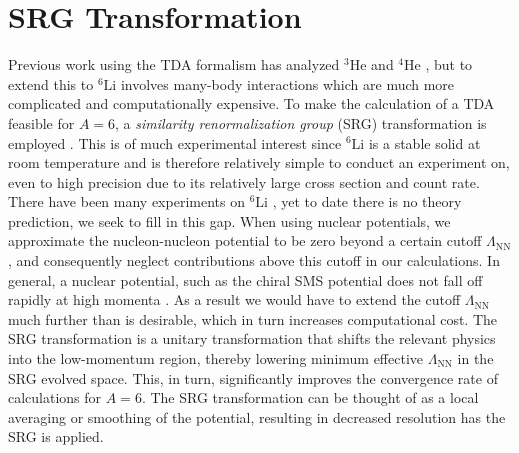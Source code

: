 \documentclass[a4paper,11pt]{article}
\newcommand{\LamNN}{\Lambda_{\mathrm{NN}}}
\newcommand{\LiS}{{}^{6} \mathrm{Li} }
\newcommand{\HeF}{{}^{4} \mathrm{He}}
\newcommand{\HeT}{{}^{3} \mathrm{He}}
\begin{document}
\section{SRG Transformation}
Previous work using the TDA formalism has analyzed
$\HeT$ and $\HeF$
\cite{hammer2020, hammer4He}
, but to extend this to $\LiS$ involves many-body
interactions which are much more complicated and computationally expensive.
To make the calculation of a TDA feasible for $A=6$, a
\textit{similarity renormalization group} (SRG) transformation
is employed \cite{SRG, Furnstahl2013}.
This is of much experimental interest since $\LiS$ is a stable solid at room temperature and is
therefore relatively simple to conduct an experiment on, even to high precision due to its relatively large
cross section and count rate.
There have been many experiments on $\LiS$ \cite{60MeV,86MeV}, yet to date there is no theory prediction,
we seek to fill in this gap.
When using nuclear potentials, we approximate the nucleon-nucleon potential to be zero
beyond a certain cutoff $\LamNN$, and consequently
neglect contributions above this cutoff in our calculations.
In general, a nuclear potential, such as the chiral SMS potential does
not fall off rapidly at high momenta \cite{Reinert2018}.
As a result we would have to
extend the cutoff $\LamNN$ much further than is desirable, which in turn
increases computational cost.
The SRG transformation is a unitary transformation that
shifts the relevant physics into the low-momentum
region, thereby lowering minimum effective $\LamNN$ in the SRG evolved space.
This, in turn, significantly improves the convergence rate of calculations for $A=6$.
The SRG transformation can be thought of as a local averaging or
smoothing of the potential, resulting in decreased resolution
has the SRG is applied.
\end{document}
